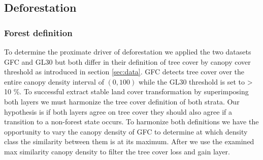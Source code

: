 	\subsection{Deforestation} 
		\subsubsection{Forest definition}
			To determine the proximate driver of deforestation we applied the two datasets \ac{GFC} and \ac{GL30} but both differ in their definition of tree cover by canopy cover threshold as introduced in section \ref{sec:data}. \ac{GFC} detects tree cover over the entire canopy density interval of $(0,100)$ while the \ac{GL30} threshold is set to > 10 \%. To successful extract stable land cover transformation by superimposing both layers we must harmonize the tree cover definition of both strata. Our hypothesis is if both layers agree on tree cover they should also agree if a transition to a non-forest state occurs. To harmonize both definitions we have the opportunity to vary the canopy density of \ac{GFC} to determine at which density class the similarity between them is at its maximum. After we use the examined max similarity canopy density to filter the tree cover loss and gain layer.

